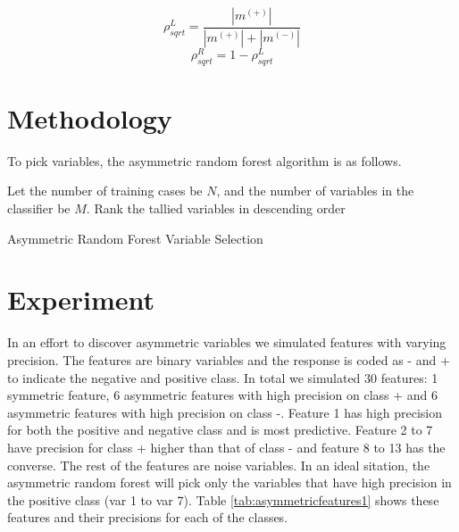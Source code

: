  \begin{equation}\label{eqn:rho_sqrt}
	\rho_{sqrt}^L = \frac{|m^{(+)}|}{|m^{(+)}|+|m^{(-)}|}
\end{equation}
\begin{equation}
	\rho_{sqrt}^R = 1- \rho_{sqrt}^L
\end{equation}


\section{Methodology}
To pick variables, the asymmetric random forest algorithm is as follows.

\begin{algorithm}
Let the number of training cases be $N$, and the number of variables in the classifier be $M$.
Rank the tallied variables in descending order 

\caption{Asymmetric Random Forest Variable Selection}\label{algo: AsymRandomForest}
\end{algorithm}

\section{Experiment}
In an effort to discover asymmetric variables we simulated features with varying precision. The features are binary variables and the response is coded as - and + to indicate the negative and positive class. In total we simulated 30 features: 1 symmetric feature, 6 asymmetric features with high precision on class + and 6 asymmetric features with high precision on class -. Feature 1 has high precision for both the positive and negative class and is most predictive. Feature 2 to 7 have precision for class + higher than that of class - and feature 8 to 13 has the converse. The rest of the features are noise variables. In an ideal sitation, the asymmetric random forest will pick only the variables that have high precision in the positive class (var 1 to var 7). Table \ref{tab:asymmetricfeatures1} shows these features and their precisions for each of the classes. 

